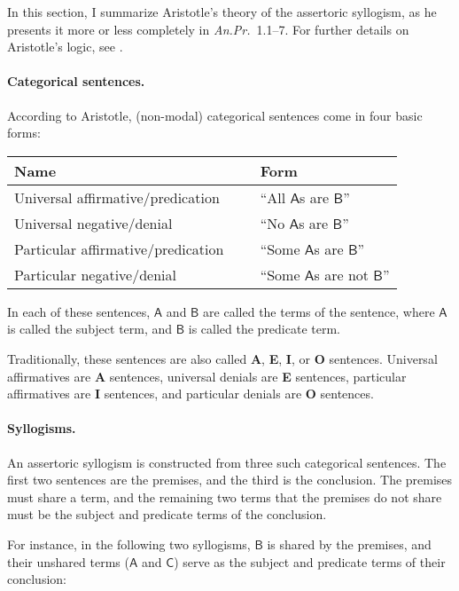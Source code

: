 \documentclass{article}
\newcommand\e{\mathsf}
\def\AnPr/{\emph{An.Pr.}}
\def\ASent/{\textbf{A}}
\def\ESent/{\textbf{E}}
\def\ISent/{\textbf{I}}
\def\OSent/{\textbf{O}}
\def\A/{\e{A}}
\def\B/{\e{B}}
\def\C/{\e{C}}
\begin{document}
In this section, I summarize Aristotle's theory of the assertoric syllogism, as he presents it more or less completely in \AnPr/~1.1--7. For further details on Aristotle's logic, see \citet{Smith1995}.


\paragraph{Categorical sentences.} 

According to Aristotle, (non-modal) categorical sentences come in four basic forms:

\begin{center}
\begin{tabular}{l p{0.25cm} l}
  \textbf{Name} & ~ & \textbf{Form} \\
  \hline
  Universal affirmative/predication & ~ & ``All $\A/$s are $\B/$'' \\
  Universal negative/denial & ~ & ``No $\A/$s are $\B/$'' \\
  Particular affirmative/predication & ~ &  ``Some $\A/$s are $\B/$'' \\
  Particular negative/denial & ~ &  ``Some $\A/$s are not $\B/$''
\end{tabular}
\end{center}

In each of these sentences, $\A/$ and $\B/$ are called the terms of the sentence, where $\A/$ is called the subject term, and $\B/$ is called the predicate term.

Traditionally, these sentences are also called \ASent/, \ESent/, \ISent/, or \OSent/ sentences. Universal affirmatives are \ASent/ sentences, universal denials are \ESent/ sentences, particular affirmatives are \ISent/ sentences, and particular denials are \OSent/ sentences. 


\paragraph{Syllogisms.}

An assertoric syllogism is constructed from three such categorical sentences. The first two sentences are the premises, and the third is the conclusion. The premises must share a term, and the remaining two terms that the premises do not share must be the subject and predicate terms of the conclusion. 

For instance, in the following two syllogisms, $\B/$ is shared by the premises, and their unshared terms ($\A/$ and $\C/$) serve as the subject and predicate terms of their conclusion:
\end{document}
